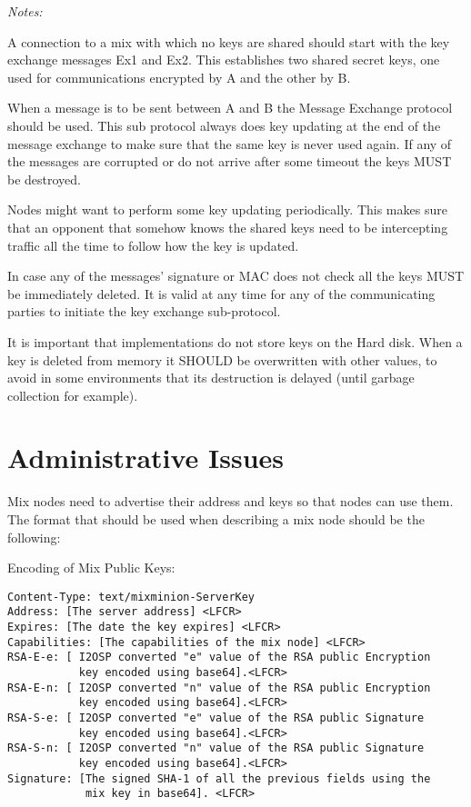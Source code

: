 \documentclass{article}
\begin{document}
\emph{Notes:}

A connection to a mix with which no keys are shared should start 
with the key exchange messages Ex1 and Ex2. This establishes two 
shared secret keys, one used for communications encrypted by A 
and the other by B. 

When a message is to be sent between A and B the Message Exchange 
protocol should be used. This sub protocol always does key updating 
at the end of the message exchange to make sure that the same key is 
never used again. If any of the messages are corrupted or do not
arrive after some timeout the keys MUST be destroyed. 

Nodes might want to perform some key updating periodically. This 
makes sure that an opponent that somehow knows the shared keys 
need to be intercepting traffic all the time to follow how the 
key is updated.

In case any of the messages' signature or MAC does not check all 
the keys MUST be immediately deleted. It is valid at any 
time for any of the communicating parties to initiate the key 
exchange sub-protocol.

It is important that implementations do not store keys on the Hard 
disk. When a key is deleted from memory it SHOULD be overwritten 
with other values, to avoid in some environments that its destruction 
is delayed (until garbage collection for example).

\section{Administrative Issues}

Mix nodes need to advertise their address and keys so that nodes can
use them. The format that should be used when describing a mix node
should be the following:

Encoding of Mix Public Keys:

\begin{verbatim}
Content-Type: text/mixminion-ServerKey
Address: [The server address] <LFCR>
Expires: [The date the key expires] <LFCR>
Capabilities: [The capabilities of the mix node] <LFCR>
RSA-E-e: [ I2OSP converted "e" value of the RSA public Encryption 
           key encoded using base64].<LFCR>
RSA-E-n: [ I2OSP converted "n" value of the RSA public Encryption 
           key encoded using base64].<LFCR>
RSA-S-e: [ I2OSP converted "e" value of the RSA public Signature 
           key encoded using base64].<LFCR>
RSA-S-n: [ I2OSP converted "n" value of the RSA public Signature 
           key encoded using base64].<LFCR>
Signature: [The signed SHA-1 of all the previous fields using the 
            mix key in base64]. <LFCR>
\end{verbatim}
\end{document}
